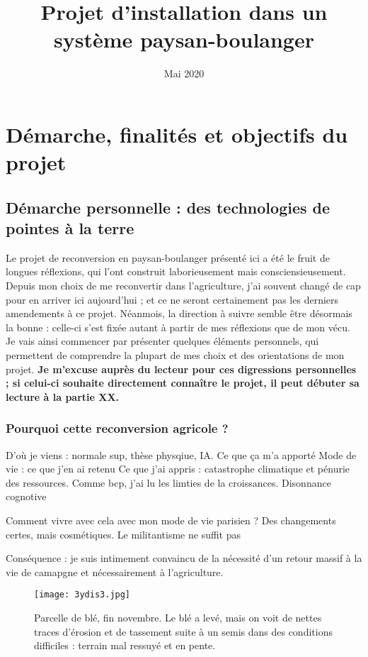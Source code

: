 \documentclass{book}
\title{Projet d'installation dans un système paysan-boulanger}
\date{Mai 2020}
\begin{document}
\maketitle

\chapter{Démarche, finalités et objectifs du projet}

\section{Démarche personnelle : des technologies de pointes à la terre}

Le projet de reconversion en paysan-boulanger présenté ici a été le fruit de longues réflexions, qui l'ont construit laborieusement mais consciensieusement. Depuis mon choix de me reconvertir dans l'agriculture, j'ai souvent changé de cap pour en arriver ici aujourd'hui ; et ce ne seront certainement pas les derniers amendements à ce projet. Néanmois, la direction à suivre semble être désormais la bonne : celle-ci s'est fixée autant à partir de mes réflexions que de mon vécu. Je vais ainsi commencer par présenter quelques éléments personnels, qui permettent de comprendre la plupart de mes choix et des orientations de mon projet.\textbf{ Je m'excuse auprès du lecteur pour ces digressions personnelles ; si celui-ci souhaite directement connaître le projet, il peut débuter sa lecture à la partie XX.}

\subsection{Pourquoi cette reconversion agricole ?}

D'où je viens : normale sup, thèse physqiue, IA. Ce que ça m'a apporté 
Mode de vie : ce que j'en ai retenu
Ce que j'ai appris : catastrophe climatique et pénurie des ressources. Comme bcp, j'ai lu les limties de la croissances.
Disonnance cognotive

Comment vivre avec cela avec mon mode de vie parisien ? Des changements certes, mais cosmétiques. Le militantisme ne suffit pas 

Conséquence : je suis intimement convaincu de la nécessité d'un retour massif à la vie de camapgne et nécessairement à l'agriculture. 

\begin{figure}
\begin{center}
	\texttt{[image: 3ydis3.jpg]}
	\caption{Parcelle de blé, fin novembre. Le blé a levé, mais on voit de nettes traces d'érosion et de tassement suite à un semis dans des conditions difficiles : terrain mal ressuyé et en pente.}
\end{center}
\end{figure}
\end{document}
